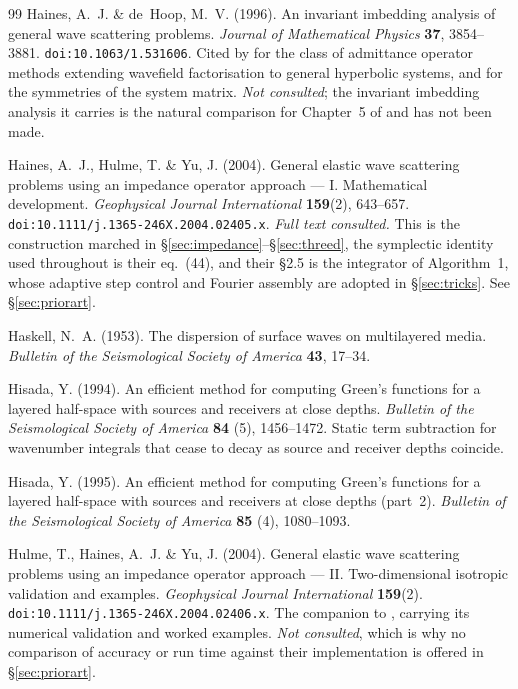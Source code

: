 \documentclass[11pt,a4paper]{article}
\begin{document}
\begin{thebibliography}{99}
 Haines, A.~J. \& de~Hoop,
  M.~V. (1996).  An invariant imbedding analysis of general wave scattering
  problems.  \emph{Journal of Mathematical Physics} \textbf{37}, 3854--3881.
  \texttt{doi:10.1063/1.531606}.  Cited by \cite{haines2004} for the class of
  admittance operator methods extending wavefield factorisation to general
  hyperbolic systems, and for the symmetries of the system matrix.  \emph{Not
  consulted}; the invariant imbedding analysis it carries is the natural
  comparison for Chapter~5 of \cite{nestor1996} and has not been made.

 Haines, A.~J., Hulme, T. \& Yu, J. (2004).
  General elastic wave scattering problems using an impedance operator
  approach --- I.  Mathematical development.  \emph{Geophysical Journal
  International} \textbf{159}(2), 643--657.
  \texttt{doi:10.1111/j.1365-246X.2004.02405.x}.  \emph{Full text consulted.}
  This is the construction marched in
  \S\ref{sec:impedance}--\S\ref{sec:threed}, the symplectic identity used
  throughout is their eq.~(44), and their \S2.5 is the integrator of
  Algorithm~1, whose adaptive step control and Fourier assembly are adopted in
  \S\ref{sec:tricks}.  See \S\ref{sec:priorart}.

 Haskell, N.~A. (1953).  The dispersion of surface waves
  on multilayered media.  \emph{Bulletin of the Seismological Society of
  America} \textbf{43}, 17--34.

 Hisada, Y. (1994).  An efficient method for computing
  Green's functions for a layered half-space with sources and receivers at close
  depths.  \emph{Bulletin of the Seismological Society of America} \textbf{84}
  (5), 1456--1472.  Static term subtraction for wavenumber integrals that cease
  to decay as source and receiver depths coincide.

 Hisada, Y. (1995).  An efficient method for computing
  Green's functions for a layered half-space with sources and receivers at close
  depths (part~2).  \emph{Bulletin of the Seismological Society of America}
  \textbf{85} (4), 1080--1093.

 Hulme, T., Haines, A.~J. \& Yu, J. (2004).
  General elastic wave scattering problems using an impedance operator approach
  --- II.  Two-dimensional isotropic validation and examples.  \emph{Geophysical
  Journal International} \textbf{159}(2).
  \texttt{doi:10.1111/j.1365-246X.2004.02406.x}.  The companion to
  \cite{haines2004}, carrying its numerical validation and worked examples.
  \emph{Not consulted}, which is why no comparison of accuracy or run time
  against their implementation is offered in \S\ref{sec:priorart}.


\end{thebibliography}
\end{document}
